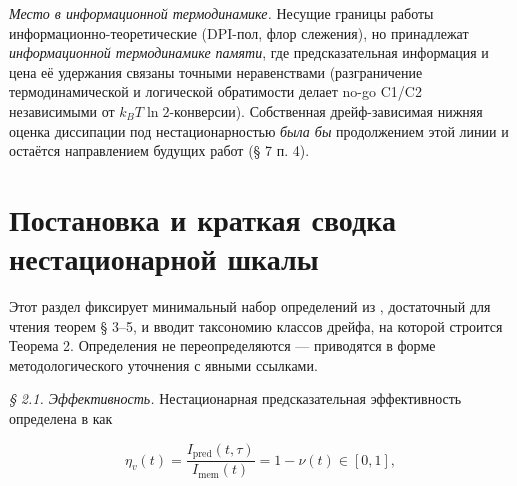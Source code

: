 \documentclass[12pt]{iopart}
\begin{document}
\emph{Место в информационной термодинамике.} Несущие границы работы информационно-теоретические (DPI-пол, флор слежения), но принадлежат \emph{информационной термодинамике памяти}, где предсказательная информация и цена её удержания связаны точными неравенствами \cite{Still2012,HartichBaratoSeifert2014,Sagawa2014,Parrondo2015} (разграничение термодинамической и логической обратимости \cite{Sagawa2014} делает no-go C1/C2 независимыми от \(k_B T\ln 2\)-конверсии). Собственная дрейф-зависимая нижняя оценка диссипации под нестационарностью \emph{была бы} продолжением этой линии и остаётся направлением будущих работ (§ 7 п. 4).



\section{Постановка и краткая сводка нестационарной шкалы}\label{ux43fux43eux441ux442ux430ux43dux43eux432ux43aux430-ux438-ux43aux440ux430ux442ux43aux430ux44f-ux441ux432ux43eux434ux43aux430-ux43dux435ux441ux442ux430ux446ux438ux43eux43dux430ux440ux43dux43eux439-ux448ux43aux430ux43bux44b}



Этот раздел фиксирует минимальный набор определений из \cite{Andriishin2026b}, достаточный для чтения теорем § 3--5, и вводит таксономию классов дрейфа, на которой строится Теорема 2. Определения не переопределяются --- приводятся в форме методологического уточнения с явными ссылками.



\emph{§ 2.1. Эффективность.} Нестационарная предсказательная эффективность определена в \cite{Andriishin2026b} как



\[\eta_v(t) = \frac{I_{\text{pred}}(t,\tau)}{I_{\text{mem}}(t)} = 1 - \nu(t) \in [0,1],\]
\end{document}
